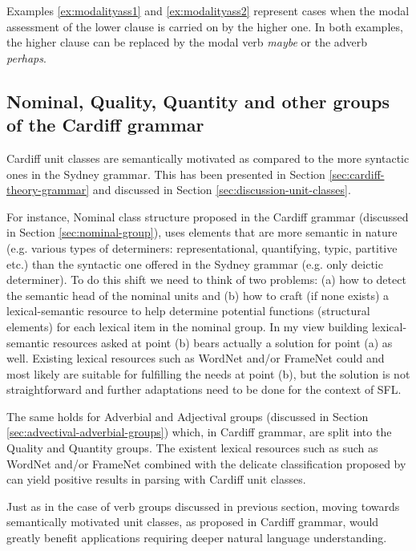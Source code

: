     Examples \ref{ex:modalityass1} and \ref{ex:modalityass2} represent cases when the modal assessment of the lower clause is carried on by the higher one. In both examples, the higher clause can be replaced by the modal verb \textit{maybe} or the adverb \textit{perhaps}. 

\subsection{Nominal, Quality, Quantity and other groups of the Cardiff grammar}
    Cardiff unit classes are semantically motivated as compared to the more syntactic ones in the Sydney grammar. This has been presented in Section \ref{sec:cardiff-theory-grammar} and discussed in Section \ref{sec:discussion-unit-classes}.

    For instance, Nominal class structure proposed in the Cardiff grammar (discussed in Section \ref{sec:nominal-group}), uses elements that are more semantic in nature (e.g. various types of determiners: representational, quantifying, typic, partitive etc.) than the syntactic one offered in the Sydney grammar (e.g. only deictic determiner). To do this shift we need to think of two problems: (a) how to detect the semantic head of the nominal units and (b) how to craft (if none exists) a lexical-semantic resource to help determine potential functions (structural elements) for each lexical item in the nominal group. In my view building lexical-semantic resources asked at point (b) bears actually a solution for point (a) as well. Existing lexical resources such as WordNet \citep{Miller1995} and/or FrameNet \citep{Baker1998} could and most likely are suitable for fulfilling the needs at point (b), but the solution is not straightforward and further adaptations need to be done for the context of SFL.

    The same holds for Adverbial and Adjectival groups (discussed in Section \ref{sec:advectival-adverbial-groups}) which, in Cardiff grammar, are split into the Quality and Quantity groups. The existent lexical resources such as such as WordNet \citep{Miller1995} and/or FrameNet\citep{Baker1998} combined with the delicate classification proposed by \citet{Tucker1997} 
    can yield positive results in parsing with Cardiff unit classes. 

    Just as in the case of verb groups discussed in previous section, moving towards semantically motivated unit classes, as proposed in Cardiff grammar, would greatly benefit applications requiring deeper natural language understanding.

